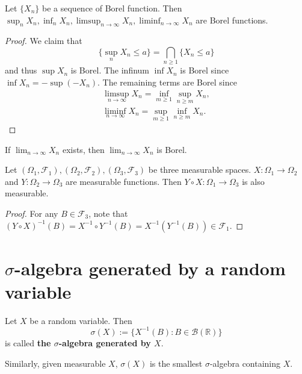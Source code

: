 \documentclass[11pt,singlecolumn, openany, citestyle=authoryear]{elegantbook}
\begin{document}
\begin{CJK}{UTF8}{gbsn}
\begin{lemma}
    Let $\{X_n\}$ be a sequence of Borel function. Then 
    $\displaystyle \sup_n X_n, \inf_n X_n, \limsup_{n \to \infty}X_n,\liminf_{n \to \infty}X_n$ are 
    Borel functions.
\end{lemma}
\begin{proof}
    We claim that 
    $$
    \{\sup_n X_n \leqslant a\} = \bigcap_{n \geq 1}\{X_n \leqslant a\}
    $$
    and thus $\sup X_n$ is Borel. 
    The infinum $\inf X_n$ is Borel since $\inf X_n = -\sup(-X_n)$.
    The remaining terms are Borel since 
    \begin{gather*}
        \limsup_{n \to \infty}X_n = \inf_{m\geqslant 1}\sup_{n \geq m}X_n, \\
        \liminf_{n \to \infty}X_n = \sup_{m\geqslant 1}\inf_{n \geq m}X_n.
    \end{gather*}
\end{proof}

\begin{corollary}
    If $\displaystyle \lim_{n\to \infty}X_n$ exists, then 
    $\displaystyle \lim_{n\to \infty}X_n$ is Borel.
\end{corollary}

\begin{lemma}
    Let $(\Omega_1,\mathcal{F}_1),(\Omega_2,\mathcal{F}_2),(\Omega_3,\mathcal{F}_3)$
    be three measurable spaces. $X:\Omega_1 \to \Omega_2$ and $Y:\Omega_2\to \Omega_3$
    are measurable functions. Then $Y \circ X:\Omega_1 \to \Omega_3$ is also measurable.
\end{lemma}
\begin{proof}
    For any $B \in \mathcal{F}_3$, note that 
    $(Y \circ X)^{-1}(B)=X^{-1}\circ Y^{-1}(B) = X^{-1}(Y^{-1}(B))\in \mathcal{F}_1$.
\end{proof}

\section{$\sigma$-algebra generated by a random variable}
\begin{definition}
    Let $X$ be a random variable. Then 
    $$
    \sigma(X):= \{X^{-1}(B):B \in \mathcal{B}(\mathbb{R})\}
    $$
    is called \textbf{the $\sigma$-algebra generated by $X$}. 
\end{definition}
Similarly, given measurable $X$, $\sigma(X)$ is the smallest $\sigma$-algebra containing $X$.


\end{CJK}
\end{document}
